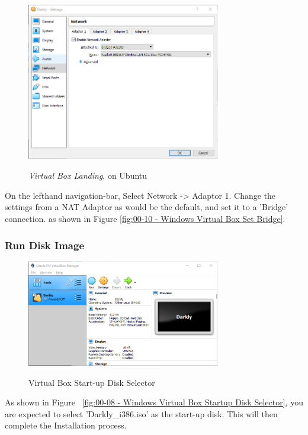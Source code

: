 \begin{figure}[!htb]
    \centering
    \includegraphics[width=0.752\textwidth]{images/Win00-09.png}\\[0cm]  
    \caption[Windows Virtual Box]{\emph{Virtual Box Landing}, on Ubuntu}
    \label{fig:00-10 - Windows Virtual Box Set Bridge} 
\end{figure}
On the lefthand navigation-bar, Select Network -> Adaptor 1.
Change the settings from a NAT Adaptor as would be the default, and set it
to a 'Bridge' connection. as shown in Figure \vref{fig:00-10 - Windows Virtual Box Set Bridge}.

\subsubsection{Run Disk Image}
\begin{figure}[!htb]
    \centering
    \includegraphics[width=0.752\textwidth]{images/Win00-10.png}\\[0cm]  
    \caption[Windows Virtual Box]{Virtual Box Start-up Disk Selector}
    \label{fig:00-08 - Windows Virtual Box Startup Disk Selector} 
\end{figure}
As shown in Figure ~\vref{fig:00-08 - Windows Virtual Box Startup Disk Selector},
you are expected to select 'Darkly\_i386.iso' as the start-up disk. This will
then complete the Installation process.

